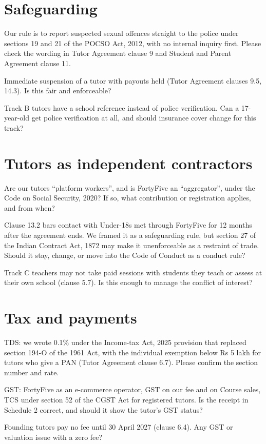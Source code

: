 \documentclass[11pt]{article}
\begin{document}
\section{Safeguarding}
\begin{clauses}
  \item Our rule is to report suspected sexual offences straight to the police under sections 19 and 21 of the POCSO Act, 2012, with no internal inquiry first. Please check the wording in Tutor Agreement clause 9 and Student and Parent Agreement clause 11.
  \item Immediate suspension of a tutor with payouts held (Tutor Agreement clauses 9.5, 14.3). Is this fair and enforceable?
  \item Track B tutors have a school reference instead of police verification. Can a 17-year-old get police verification at all, and should insurance cover change for this track?
\end{clauses}

\section{Tutors as independent contractors}
\begin{clauses}
  \item Are our tutors ``platform workers'', and is FortyFive an ``aggregator'', under the Code on Social Security, 2020? If so, what contribution or registration applies, and from when?
  \item Clause 13.2 bars contact with Under-18s met through FortyFive for 12 months after the agreement ends. We framed it as a safeguarding rule, but section 27 of the Indian Contract Act, 1872 may make it unenforceable as a restraint of trade. Should it stay, change, or move into the Code of Conduct as a conduct rule?
  \item Track C teachers may not take paid sessions with students they teach or assess at their own school (clause 5.7). Is this enough to manage the conflict of interest?
\end{clauses}

\section{Tax and payments}
\begin{clauses}
  \item TDS: we wrote 0.1\% under the Income-tax Act, 2025 provision that replaced section 194-O of the 1961 Act, with the individual exemption below Rs 5 lakh for tutors who give a PAN (Tutor Agreement clause 6.7). Please confirm the section number and rate.
  \item GST: FortyFive as an e-commerce operator, GST on our fee and on Course sales, TCS under section 52 of the CGST Act for registered tutors. Is the receipt in Schedule 2 correct, and should it show the tutor's GST status?
  \item Founding tutors pay no fee until 30 April 2027 (clause 6.4). Any GST or valuation issue with a zero fee?
\end{clauses}
\end{document}
